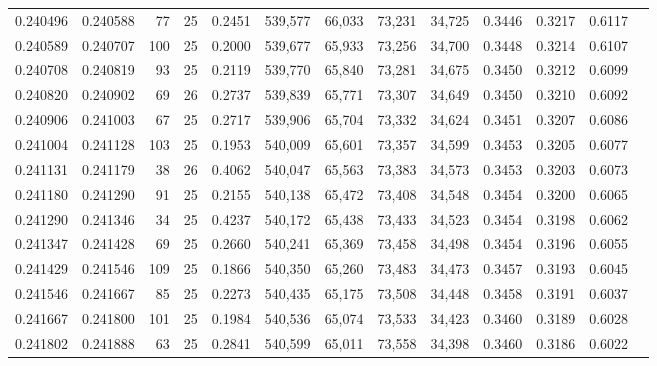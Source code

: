 \begin{tabular}{rrrrrrrrrrrrr}
0.240496 & 0.240588 &    77 &  25 &                                     0.2451 & 539,577 &  66,033 &  73,231 &  34,725 & 0.3446 & 0.3217 & 0.6117 \\
0.240589 & 0.240707 &   100 &  25 &                                     0.2000 & 539,677 &  65,933 &  73,256 &  34,700 & 0.3448 & 0.3214 & 0.6107 \\
0.240708 & 0.240819 &    93 &  25 &                                     0.2119 & 539,770 &  65,840 &  73,281 &  34,675 & 0.3450 & 0.3212 & 0.6099 \\
0.240820 & 0.240902 &    69 &  26 &                                     0.2737 & 539,839 &  65,771 &  73,307 &  34,649 & 0.3450 & 0.3210 & 0.6092 \\
0.240906 & 0.241003 &    67 &  25 &                                     0.2717 & 539,906 &  65,704 &  73,332 &  34,624 & 0.3451 & 0.3207 & 0.6086 \\
0.241004 & 0.241128 &   103 &  25 &                                     0.1953 & 540,009 &  65,601 &  73,357 &  34,599 & 0.3453 & 0.3205 & 0.6077 \\
0.241131 & 0.241179 &    38 &  26 &                                     0.4062 & 540,047 &  65,563 &  73,383 &  34,573 & 0.3453 & 0.3203 & 0.6073 \\
0.241180 & 0.241290 &    91 &  25 &                                     0.2155 & 540,138 &  65,472 &  73,408 &  34,548 & 0.3454 & 0.3200 & 0.6065 \\
0.241290 & 0.241346 &    34 &  25 &                                     0.4237 & 540,172 &  65,438 &  73,433 &  34,523 & 0.3454 & 0.3198 & 0.6062 \\
0.241347 & 0.241428 &    69 &  25 &                                     0.2660 & 540,241 &  65,369 &  73,458 &  34,498 & 0.3454 & 0.3196 & 0.6055 \\
0.241429 & 0.241546 &   109 &  25 &                                     0.1866 & 540,350 &  65,260 &  73,483 &  34,473 & 0.3457 & 0.3193 & 0.6045 \\
0.241546 & 0.241667 &    85 &  25 &                                     0.2273 & 540,435 &  65,175 &  73,508 &  34,448 & 0.3458 & 0.3191 & 0.6037 \\
0.241667 & 0.241800 &   101 &  25 &                                     0.1984 & 540,536 &  65,074 &  73,533 &  34,423 & 0.3460 & 0.3189 & 0.6028 \\
0.241802 & 0.241888 &    63 &  25 &                                     0.2841 & 540,599 &  65,011 &  73,558 &  34,398 & 0.3460 & 0.3186 & 0.6022 \\

\end{tabular}
